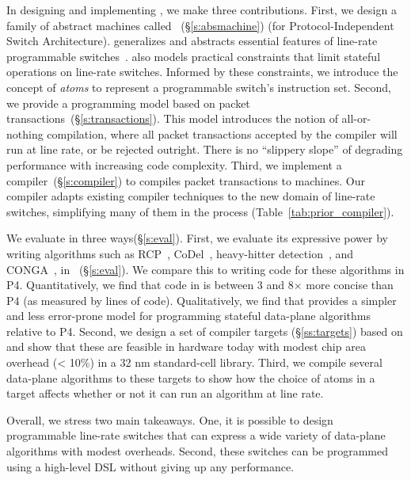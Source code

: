 
In designing and implementing \pktlanguage, we make three contributions.
First, we design a family of abstract machines called
\absmachine~(\S\ref{s:absmachine}) (for Protocol-Independent Switch
Architecture). \absmachine generalizes and abstracts essential features of
line-rate programmable switches~\cite{rmt, xpliant, flexpipe}. \absmachine also
models practical constraints that limit stateful operations on line-rate
switches.  Informed by these constraints, we introduce the concept of {\em
atoms} to represent a programmable switch's instruction set.  Second, we
provide a programming model based on packet
transactions~(\S\ref{s:transactions}).  This model introduces the notion of
all-or-nothing compilation, where all packet transactions accepted by the
compiler will run at line rate, or be rejected outright. There is no ``slippery
slope'' of degrading performance with increasing code complexity.  Third, we
implement a compiler~(\S\ref{s:compiler}) to compiles packet transactions to
\absmachine machines. Our compiler adapts existing compiler techniques to the
new domain of line-rate switches, simplifying many of them in the process
(Table~\ref{tab:prior_compiler}).

We evaluate \pktlanguage in three ways(\S\ref{s:eval}). First, we evaluate its
expressive power by writing algorithms such as RCP~\cite{rcp},
CoDel~\cite{codel}, heavy-hitter detection~\cite{opensketch}, and
CONGA~\cite{conga}, in \pktlanguage~(\S\ref{s:eval}). We compare this to
writing code for these algorithms in P4. Quantitatively, we find that code in
\pktlanguage is between 3 and 8$\times$ more concise than P4 (as measured by
lines of code).  Qualitatively, we find that \pktlanguage provides a simpler
and less error-prone model for programming stateful data-plane algorithms
relative to P4.  Second, we design a set of compiler targets
(\S\ref{ss:targets}) based on \absmachine and show that these are feasible in
hardware today with modest chip area overhead (< 10\%) in a 32 nm standard-cell
library. Third, we compile several data-plane algorithms to these targets to
show how the choice of atoms in a target affects whether or not it can run an
algorithm at line rate.

Overall, we stress two main takeaways. One, it is possible to design
programmable line-rate switches that can express a wide variety of data-plane
algorithms with modest overheads. Second, these switches can be programmed
using a high-level DSL without giving up any performance.
